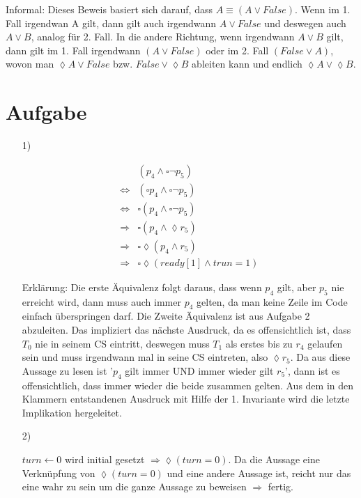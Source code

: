 \begin{itemize}
Informal: Dieses Beweis basiert sich darauf, dass $A \equiv (A \lor False)$. Wenn im 1. Fall irgendwan A gilt, dann gilt auch irgendwann $A \lor False $ und deswegen auch $ A \lor B $, analog für 2. Fall. In die andere Richtung, wenn irgendwann $ A \lor B $ gilt, dann gilt im 1. Fall irgendwann $ (A \lor False) $ oder im 2. Fall $ (False \lor A) $, wovon man $\lozenge A \lor False$ bzw. $False \lor \lozenge B$ ableiten kann und endlich $\lozenge A \lor \lozenge B$.

\end{itemize}

\section{Aufgabe}

\begin{itemize}

\item[1)]

\begin{align}
	& (p_4 \land \square \neg p_5) \\
	\Leftrightarrow & (\square p_4 \land \square \neg p_5) \\
	\Leftrightarrow & \square (p_4 \land \square \neg p_5) \\
	\Rightarrow & \square (p_4 \land \lozenge r_5) \\
	\Rightarrow & \square \lozenge (p_4 \land r_5) \\
	\Rightarrow & \square \lozenge (ready[1] \land trun=1)
\end{align}

Erklärung: Die erste Äquivalenz folgt daraus, dass wenn $p_4$ gilt, aber $p_5$ nie erreicht wird,
dann muss auch immer $p_4$ gelten, da man keine Zeile im Code einfach überspringen darf. Die Zweite Äquivalenz ist aus Aufgabe 2 abzuleiten. Das impliziert das nächste Ausdruck, da es offensichtlich ist, dass $T_0$ nie in seinem CS eintritt, deswegen muss $T_1$ als erstes bis zu $r_4$ gelaufen sein und muss irgendwann mal in seine CS eintreten, also $\lozenge r_5$. Da aus diese Aussage zu lesen ist '$p_4$ gilt immer UND immer wieder gilt $r_5$', dann ist es offensichtlich, dass immer wieder die beide zusammen gelten. Aus dem in den Klammern entstandenen Ausdruck mit Hilfe der 1. Invariante wird die letzte Implikation hergeleitet.

\item[2)]

$turn \leftarrow 0$ wird initial gesetzt $\Rightarrow \lozenge (turn = 0)$. Da die Aussage eine Verknüpfung von $\lozenge (turn = 0)$ und eine andere Aussage ist, reicht nur das eine wahr zu sein um die ganze Aussage zu beweisen $\Rightarrow$ fertig. \\ \\


\end{itemize}
